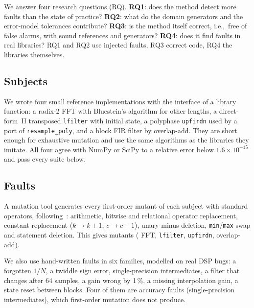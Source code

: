 \documentclass[10pt,conference]{IEEEtran}
\newcommand{\code}[1]{\texttt{#1}}
\newcommand{\ie}{i.e.,\ }
\begin{document}
We answer four research questions (RQ).
\textbf{RQ1}: does the method detect more faults than the state of practice?
\textbf{RQ2}: what do the domain generators and the error-model tolerances contribute?
\textbf{RQ3}: is the method itself correct, \ie free of false alarms, with sound references and generators?
\textbf{RQ4}: does it find faults in real libraries?
RQ1 and RQ2 use injected faults, RQ3 correct code, RQ4 the libraries
themselves.

\subsection{Subjects}
We wrote four small reference implementations with the interface of a library
function: a radix-2 FFT with Bluestein's algorithm for other lengths, a
direct-form~II transposed \code{lfilter} with initial state, a polyphase
\code{upfirdn} used by a port of \code{resample\_poly}, and a block FIR filter
by overlap-add. They are short enough for exhaustive mutation and use the same
algorithms as the libraries they imitate. All four agree with NumPy or SciPy to
a relative error below $1.6\times10^{-15}$ and pass every suite below.

\subsection{Faults}
A mutation tool generates every first-order mutant of each subject with
standard operators, following~\cite{offutt1996mutation,jia2011mutation}: arithmetic, bitwise and
relational operator replacement, constant replacement ($k\to k\pm1$,
$c\to c+1$), unary minus deletion, \code{min}/\code{max} swap and statement
deletion. This gives \nMutAuto{} mutants (\nMutFft{} FFT, \nMutLfilter{}
\code{lfilter}, \nMutUpfirdn{} \code{upfirdn}, \nMutOla{} overlap-add).

We also use \nMutHand{} hand-written faults in six families, modelled on real
DSP bugs: a forgotten $1/N$, a twiddle sign error, single-precision
intermediates, a filter that changes after 64 samples, a gain wrong by 1\,\%, a
missing interpolation gain, a state reset between blocks. Four of them are
accuracy faults (single-precision intermediates), which first-order mutation
does not produce.
\end{document}

